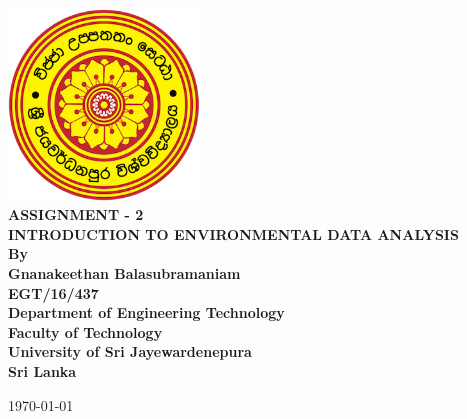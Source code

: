 \documentclass[12pt,a4paper,oneside]{article}
\begin{document}
\begin{titlepage}

\begin{flushright}
\end{flushright}


\center %
{
\includegraphics[width=2in,keepaspectratio]{logo.png}\\[0.5cm]
\fontsize{24pt}{30}\selectfont \textbf{\uppercase{Assignment - 2}}\\[1.5cm]
\fontsize{16}{24}\selectfont \textbf{\uppercase{Introduction to Environmental Data Analysis}}\\[1.5cm]
\fontsize{16pt}{24}\selectfont \textbf{By}\\[0.5cm]
\fontsize{12pt}{12}\selectfont {
}
\vspace*{\fill}
\fontsize{12pt}{12}\selectfont \textbf { Gnanakeethan Balasubramaniam \\ EGT/16/437}\\[0.5cm]


\vspace*{\fill}
\fontsize{12pt}{12}\selectfont \textbf {Department of Engineering Technology \\ Faculty of Technology\\University of Sri Jayewardenepura\\ Sri Lanka \\ }
\vspace*{\fill}

\today
}


\end{titlepage}
\end{document}
